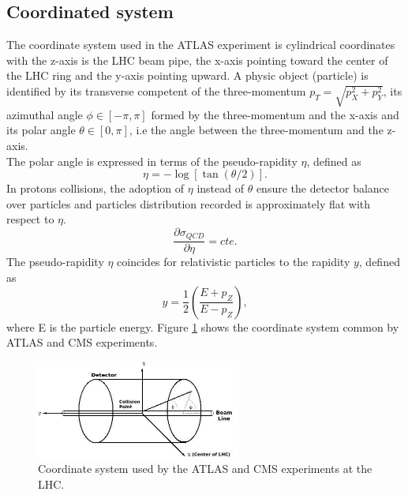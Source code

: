 \subsection{Coordinated system}
\label{chap2:ATLAS:CS}
The coordinate system used in the ATLAS experiment is cylindrical coordinates with the z-axis is the LHC beam pipe, the x-axis pointing toward the center of the LHC ring and the y-axis pointing upward. A physic object (particle) is identified by its transverse competent of the three-momentum $p_T = \sqrt{p_X^2 + p_Y^2}$, its azimuthal angle $\phi \in [-\pi,\pi] $ formed by the three-momentum and the x-axis and its polar angle $\theta \in [0,\pi]$, i.e the angle between the three-momentum and the z-axis. \\
The polar angle is expressed in terms of the pseudo-rapidity $\eta$, defined as
\begin{equation}
\eta = -\log[\tan(\theta/2)].
\end{equation}
In protons collisions, the adoption of $\eta$ instead of $\theta$ ensure the detector balance over particles and particles distribution recorded is approximately flat with respect to $\eta$.
\begin{equation}
\frac{\partial\sigma_{QCD}}{\partial\eta} = cte.
\end{equation}
The pseudo-rapidity $\eta$ coincides for relativistic particles to the rapidity $y$, defined as 
\begin{equation}
y = \frac{1}{2}(\frac{E+p_Z}{E-p_Z}),
\end{equation}
where E is the particle energy.
Figure \ref{fig:chap2:ATLAS:SYS} shows the coordinate system common by ATLAS and CMS experiments.
\begin{figure}[H]
    \centering
    \includegraphics[width=0.6\textwidth]{Ch2/Img/ATLAS_Sys.jpeg}
    \caption{Coordinate system used by the ATLAS and CMS experiments at the LHC.}
    \label{fig:chap2:ATLAS:SYS}
\end{figure}

